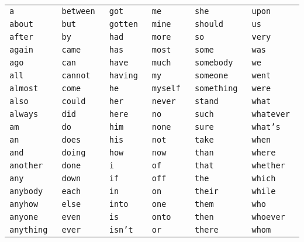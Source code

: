 \begin{tabular}{llllll}
{\tt a }        & {\tt between }    & {\tt got }    & {\tt me }        & {\tt she }       & {\tt upon } \\
{\tt about }    & {\tt but }        & {\tt gotten } & {\tt mine }      & {\tt should }    & {\tt us } \\
{\tt after }    & {\tt by }         & {\tt had }    & {\tt more }      & {\tt so }        & {\tt very } \\
{\tt again }    & {\tt came }       & {\tt has }    & {\tt most }      & {\tt some }      & {\tt was } \\
{\tt ago }      & {\tt can }        & {\tt have }   & {\tt much }      & {\tt somebody }  & {\tt we } \\
{\tt all }      & {\tt cannot }     & {\tt having } & {\tt my }        & {\tt someone }   & {\tt went } \\
{\tt almost }   & {\tt come }       & {\tt he }     & {\tt myself }    & {\tt something } & {\tt were } \\
{\tt also }     & {\tt could }      & {\tt her }    & {\tt never }     & {\tt stand }     & {\tt what } \\
{\tt always }   & {\tt did }        & {\tt here }   & {\tt no }        & {\tt such }      & {\tt whatever } \\
{\tt am }       & {\tt do }         & {\tt him }    & {\tt none }      & {\tt sure }      & {\tt what's } \\
{\tt an }       & {\tt does }       & {\tt his }    & {\tt not }       & {\tt take }      & {\tt when } \\
{\tt and }      & {\tt doing }      & {\tt how }    & {\tt now }       & {\tt than }      & {\tt where } \\
{\tt another }  & {\tt done }       & {\tt i }      & {\tt of }        & {\tt that }      & {\tt whether } \\
{\tt any }      & {\tt down }       & {\tt if }     & {\tt off }       & {\tt the }       & {\tt which } \\
{\tt anybody }  & {\tt each }       & {\tt in }     & {\tt on }        & {\tt their }     & {\tt while } \\
{\tt anyhow }   & {\tt else }       & {\tt into }   & {\tt one }       & {\tt them }      & {\tt who } \\
{\tt anyone }   & {\tt even }       & {\tt is }     & {\tt onto }      & {\tt then }      & {\tt whoever } \\
{\tt anything } & {\tt ever }       & {\tt isn't }  & {\tt or }        & {\tt there }     & {\tt whom } \\

\end{tabular}
